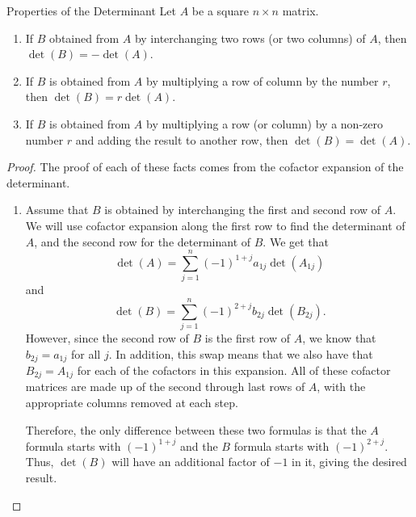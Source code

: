\begin{theorem1}[detElem]{Properties of the Determinant}
Let $A$ be a square $n\times n$ matrix. 
\begin{enumerate}
\item If $B$ obtained from $A$ by interchanging two rows (or two columns) of $A$, then $\det(B) = -\det(A)$.
\item If $B$ is obtained from $A$ by multiplying a row of column by the number $r$, then $\det(B) = r\det(A)$.
\item If $B$ is obtained from $A$ by multiplying a row (or column) by a non-zero number $r$ and adding the result to another row, then $\det(B) = \det(A)$.
\end{enumerate}
\end{theorem1} 

\begin{proof}
The proof of each of these facts comes from the cofactor expansion of the determinant.
\begin{enumerate}
\item Assume that $B$ is obtained by interchanging the first and second row of $A$. We will use cofactor expansion along the first row to find the determinant of $A$, and the second row for the determinant of $B$. We get that
\[ \det(A) = \sum_{j=1}^n (-1)^{1+j}a_{1j} \det(A_{1j}) \] and 
\[ \det(B) = \sum_{j=1}^n (-1)^{2+j}b_{2j} \det(B_{2j}). \] However, since the second row of $B$ is the first row of $A$, we know that $b_{2j} = a_{1j}$ for all $j$. In addition, this swap means that we also have that $B_{2j} = A_{1j}$ for each of the cofactors in this expansion. All of these cofactor matrices are made up of the second through last rows of $A$, with the appropriate columns removed at each step. 

Therefore, the only difference between these two formulas is that the $A$ formula starts with $(-1)^{1+j}$ and the $B$ formula starts with $(-1)^{2+j}$. Thus, $\det(B)$ will have an additional factor of $-1$ in it, giving the desired result.


\end{enumerate}
\end{proof}
